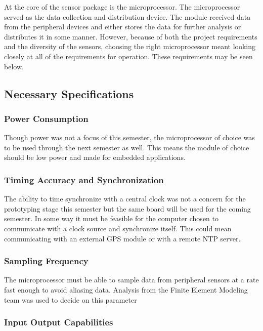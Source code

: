 
\indent At the core of the sensor package is the microprocessor. The
microprocessor served as the data collection and distribution
device. The module received data from the peripheral devices and
either stores the data for further analysis or distributes it in
some manner. However, because of both the project requirements
and the diversity of the sensors, choosing the right
microprocessor meant looking closely at all of the requirements
for operation. These requirements may be seen below. 
\subsection{Necessary Specifications}
\subsubsection{Power Consumption}

\indent Though power was not a focus of this semester, the
microprocessor of choice was to be used through the next semester
as well. This means the module of choice should be low power and
made for embedded applications. 

\subsubsection{Timing Accuracy and Synchronization}

\indent The ability to time
synchronize with a central clock was not a concern for
the prototyping stage this semester but the same board will be used
for the coming semester. In some way it must be feasible for the
computer chosen to communicate with a clock source and
synchronize itself. This could mean communicating with an
external GPS module or with a remote NTP server. 
\subsubsection{Sampling Frequency}

The microprocessor must be able to sample data from peripheral sensors at a rate fast enough to avoid aliasing data. Analysis from the Finite Element Modeling team was used to decide on this parameter

\subsubsection{Input Output Capabilities}

